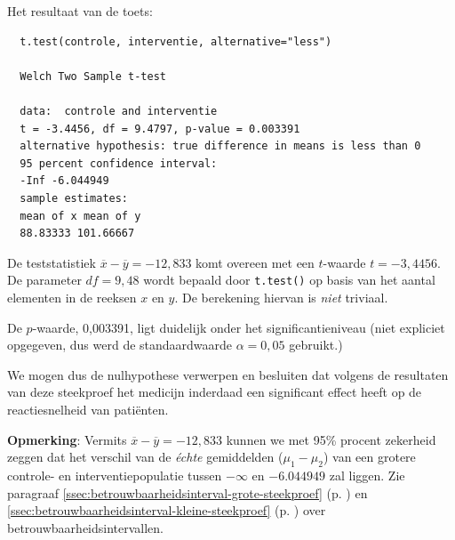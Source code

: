 \begin{example}
  Het resultaat van de toets:
  
  \begin{verbatim}
  t.test(controle, interventie, alternative="less")
  
  Welch Two Sample t-test
  
  data:  controle and interventie
  t = -3.4456, df = 9.4797, p-value = 0.003391
  alternative hypothesis: true difference in means is less than 0
  95 percent confidence interval:
  -Inf -6.044949
  sample estimates:
  mean of x mean of y 
  88.83333 101.66667
  \end{verbatim}
  
  De teststatistiek $\overline{x}-\overline{y}=-12,833$ komt overeen met een $t$-waarde $t=-3,4456$.
  De parameter $df=9,48$ wordt bepaald door \texttt{t.test()} op basis van
  het aantal elementen in de reeksen $x$ en $y$.
  De berekening hiervan is \textit{niet} triviaal.
  
  De $p$-waarde, 0,003391, ligt duidelijk onder het significantieniveau (niet expliciet opgegeven, dus werd de standaardwaarde $\alpha = 0,05$ gebruikt.)
  
  We mogen dus de nulhypothese verwerpen en besluiten dat volgens de resultaten van deze steekproef het medicijn inderdaad een significant effect heeft op de reactiesnelheid van patiënten.
  
  \textbf{Opmerking}: Vermits $\overline{x}-\overline{y}=-12,833$
  kunnen we met 95\% procent zekerheid zeggen dat het verschil van de \textit{\'echte} gemiddelden ($\mu_1-\mu_2$)
  van een grotere controle- en interventiepopulatie tussen $-\infty$ en $-6.044949$ zal liggen.
  Zie paragraaf \ref{ssec:betrouwbaarheidsinterval-grote-steekproef} (p. \pageref{ssec:betrouwbaarheidsinterval-grote-steekproef})
  en \ref{ssec:betrouwbaarheidsinterval-kleine-steekproef} (p. \pageref{ssec:betrouwbaarheidsinterval-kleine-steekproef})
  over betrouwbaarheidsintervallen.
\end{example}

